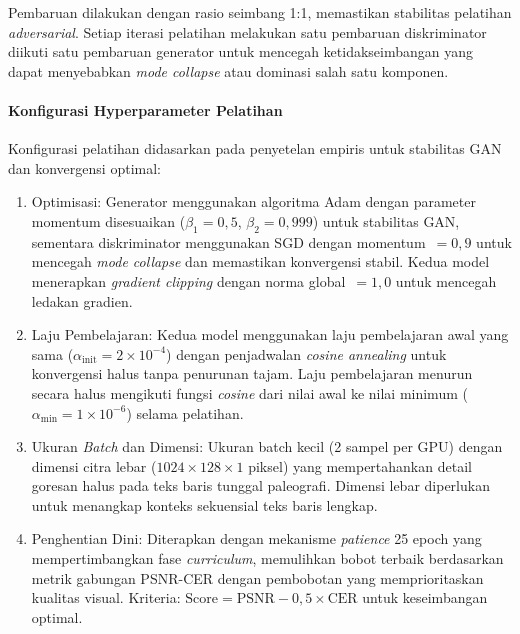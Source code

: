 \documentclass[12pt,a4paper]{article}
\begin{document}
Pembaruan dilakukan dengan rasio seimbang 1:1, memastikan stabilitas pelatihan \textit{adversarial}. Setiap iterasi pelatihan melakukan satu pembaruan diskriminator diikuti satu pembaruan generator untuk mencegah ketidakseimbangan yang dapat menyebabkan \textit{mode collapse} atau dominasi salah satu komponen.

\paragraph{Konfigurasi Hyperparameter Pelatihan}

Konfigurasi pelatihan didasarkan pada penyetelan empiris untuk stabilitas GAN dan konvergensi optimal:

\begin{enumerate}[label=\alph*., leftmargin=1.5em, labelsep=0.5em, itemindent=0pt, noitemsep, topsep=0pt]
  \item Optimisasi: Generator menggunakan algoritma Adam dengan parameter momentum disesuaikan ($\beta_1=0,5$, $\beta_2=0,999$) untuk stabilitas GAN, sementara diskriminator menggunakan SGD dengan momentum~$=0,9$ untuk mencegah \textit{mode collapse} dan memastikan konvergensi stabil. Kedua model menerapkan \textit{gradient clipping} dengan norma global~$=1,0$ untuk mencegah ledakan gradien.

  \item Laju Pembelajaran: Kedua model menggunakan laju pembelajaran awal yang sama ($\alpha_{\text{init}}=2\times10^{-4}$) dengan penjadwalan \textit{cosine annealing} untuk konvergensi halus tanpa penurunan tajam. Laju pembelajaran menurun secara halus mengikuti fungsi \textit{cosine} dari nilai awal ke nilai minimum ($\alpha_{\text{min}}=1\times10^{-6}$) selama pelatihan.

  \item Ukuran \textit{Batch} dan Dimensi: Ukuran batch kecil (2 sampel per GPU) dengan dimensi citra lebar ($1024 \times 128 \times 1$ piksel) yang mempertahankan detail goresan halus pada teks baris tunggal paleografi. Dimensi lebar diperlukan untuk menangkap konteks sekuensial teks baris lengkap.

  \item Penghentian Dini: Diterapkan dengan mekanisme \textit{patience} 25 epoch yang mempertimbangkan fase \textit{curriculum}, memulihkan bobot terbaik berdasarkan metrik gabungan PSNR-CER dengan pembobotan yang memprioritaskan kualitas visual. Kriteria: $\text{Score} = \text{PSNR} - 0,5 \times \text{CER}$ untuk keseimbangan optimal.
\end{enumerate}
\end{document}

